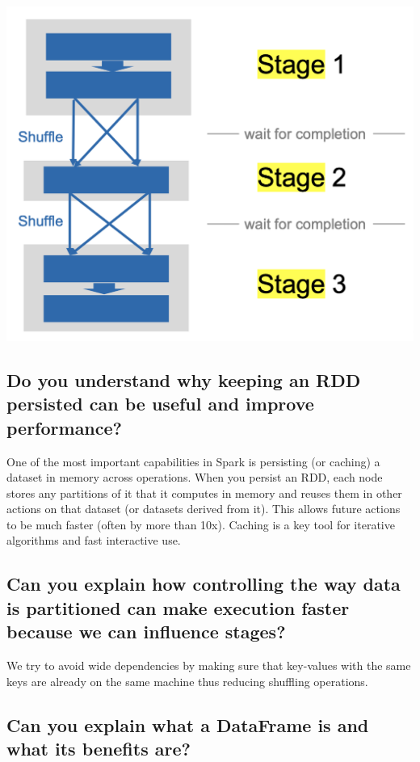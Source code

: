 \documentclass{article}
\begin{document}
\includegraphics[width=\linewidth]{img/stages.png}

\subsection{Do you understand why keeping an RDD persisted can be useful and improve performance?}

One of the most important capabilities in Spark is persisting (or caching) a dataset in memory across operations. When you persist an RDD, each node stores any partitions of it that it computes in memory and reuses them in other actions on that dataset (or datasets derived from it). This allows future actions to be much faster (often by more than 10x). Caching is a key tool for iterative algorithms and fast interactive use.

\subsection{Can you explain how controlling the way data is partitioned can make execution faster because we can influence stages?}

We try to avoid wide dependencies by making sure that key-values with the same keys are already on the same machine thus reducing shuffling operations. 

\subsection{Can you explain what a DataFrame is and what its benefits are?}
\end{document}
